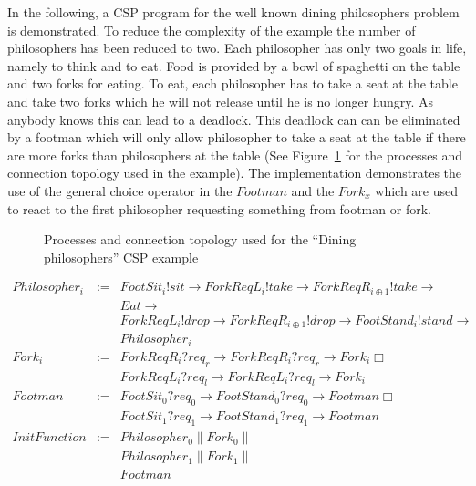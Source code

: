 In the following, a CSP program for the well known dining
philosophers problem is demonstrated. To reduce the complexity
of the example the number of philosophers has been reduced
to two. Each philosopher has only two goals in life, namely to think and
to eat. Food is provided by a bowl of spaghetti on the table and
two forks for eating. To eat, each philosopher has to take a seat
at the table and take two forks which he will not release until he
is no longer hungry. As anybody knows this can lead to a deadlock.
This deadlock can can be eliminated by a footman which will only
allow philosopher to take a seat at the table if there are more
forks than philosophers at the table (See Figure~\ref{fig:dining-philosophers}
for the processes and connection topology used in the example).
The implementation demonstrates the use of the general choice operator
in the $Footman$ and the $Fork_{x}$ which are used to react to the first
philosopher requesting something from footman or fork.

\begin{figure}[h]
\centering

\caption{Processes and connection topology used for the ``Dining philosophers'' CSP example}
\label{fig:dining-philosophers}
\end{figure}

\begin{displaymath}
\begin{array}{rcl}
Philosopher_{i}    & := & FootSit_{i}!sit \to ForkReqL_{i}!take \to ForkReqR_{i\oplus1}!take \to \\
                   &    & Eat \to \\
                   &    & ForkReqL_{i}!drop \to ForkReqR_{i\oplus1}!drop \to FootStand_{i}!stand \to \\
                   &        & Philosopher_{i} \\
Fork_{i}           & := & ForkReqR_{i}?req_{r} \to ForkReqR_{i}?req_{r} \to Fork_{i} \Box \\
                   &    & ForkReqL_{i}?req_{l} \to ForkReqL_{i}?req_{l} \to Fork_{i} \\
Footman                   & := & FootSit_{0}?req_{0} \to FootStand_{0}?req_{0} \to Footman \Box \\
                   &    & FootSit_{1}?req_{1} \to FootStand_{1}?req_{1} \to Footman \\
InitFunction       & := & Philosopher_{0} \| Fork_{0} \| \\
                   &    & Philosopher_{1} \| Fork_{1} \| \\
                   &    & Footman \\
\end{array}
\end{displaymath}


